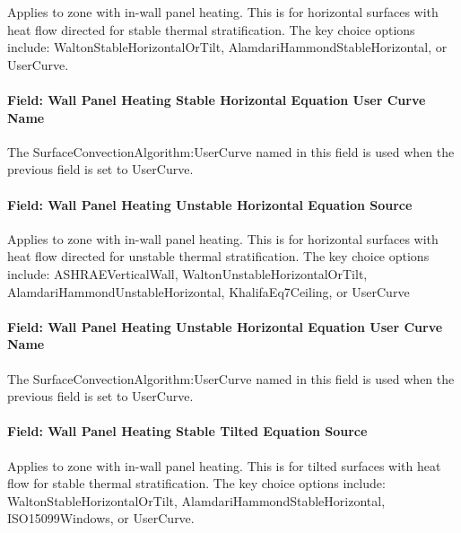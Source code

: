 Applies to zone with in-wall panel heating. This is for horizontal surfaces with heat flow directed for stable thermal stratification. The key choice options include: WaltonStableHorizontalOrTilt, AlamdariHammondStableHorizontal, or UserCurve.

\paragraph{Field: Wall Panel Heating Stable Horizontal Equation User Curve Name}\label{field-wall-panel-heating-stable-horizontal-equation-user-curve-name}

The SurfaceConvectionAlgorithm:UserCurve named in this field is used when the previous field is set to UserCurve.

\paragraph{Field: Wall Panel Heating Unstable Horizontal Equation Source}\label{field-wall-panel-heating-unstable-horizontal-equation-source}

Applies to zone with in-wall panel heating. This is for horizontal surfaces with heat flow directed for unstable thermal stratification. The key choice options include: ASHRAEVerticalWall, WaltonUnstableHorizontalOrTilt, AlamdariHammondUnstableHorizontal, KhalifaEq7Ceiling, or UserCurve

\paragraph{Field: Wall Panel Heating Unstable Horizontal Equation User Curve Name}\label{field-wall-panel-heating-unstable-horizontal-equation-user-curve-name}

The SurfaceConvectionAlgorithm:UserCurve named in this field is used when the previous field is set to UserCurve.

\paragraph{Field: Wall Panel Heating Stable Tilted Equation Source}\label{field-wall-panel-heating-stable-tilted-equation-source}

Applies to zone with in-wall panel heating. This is for tilted surfaces with heat flow for stable thermal stratification. The key choice options include: WaltonStableHorizontalOrTilt, AlamdariHammondStableHorizontal, ISO15099Windows, or UserCurve.


